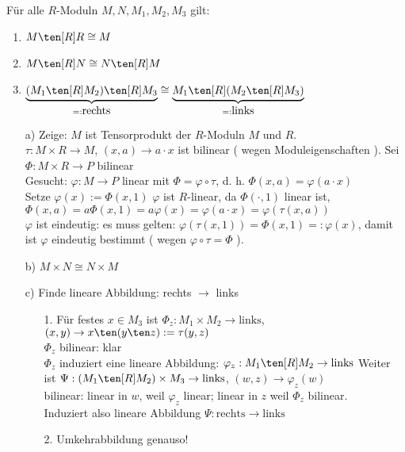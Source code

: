 \begin{Bem}
  Für alle $R$-Moduln $M, N, M_1, M_2, M_3$ gilt:
  \begin{enumerate}
  	\item $M \ten[R] R \cong M$
  	\item $M \ten[R] N \cong N \ten[R] M$
  	\item $\underbrace{(M_1 \ten[R] M_2) \ten[R] M_3}_{=: \mbox{rechts}} \cong 
	\underbrace{M_1 \ten[R] ( M_2 \ten[R] M_3)}_{=: \mbox{links}}$
  \end{enumerate}
\end{Bem}
\begin{Bew}
  \begin{enumerate}
    \item[a)] Zeige: $M$ ist Tensorprodukt der $R$-Moduln $M$ und $R$.\\
	  $\tau: M \times R \rightarrow M$, $(x,a) \rightarrow a \cdot x$ ist bilinear ( wegen 
	  Moduleigenschaften ). Sei $\Phi: M \times R \rightarrow P$ bilinear\\
	  Gesucht: $\varphi: M \rightarrow P$ linear mit $\Phi = \varphi \circ \tau$, d. h. 
	  $\Phi(x,a) = \varphi(a \cdot x)$\\
	  Setze $\varphi(x) := \Phi(x,1)$ $\varphi$ ist $R$-linear, da $\Phi( \cdot, 1)$ linear
	  ist, $\Phi(x,a) = a\Phi(x,1) = a\varphi(x) = \varphi(a \cdot x ) = \varphi(\tau(x,a))$\\
	  $\varphi$ ist eindeutig: es muss gelten: $\varphi(\tau(x,1)) = \Phi(x,1) =: \varphi(x)$, 
	  damit ist $\varphi$ eindeutig bestimmt ( wegen $\varphi \circ \tau = \Phi$ ).
    \item[b)] $M \times N \cong N \times M$
    \item[c)] Finde lineare Abbildung: rechts $\rightarrow$ links
	  \begin{enumerate}
	    \item[ 1. ] Für festes $x \in M_3$ ist $\Phi_z: M_1 \times M_2 \rightarrow \mbox{links}$, 
		  $(x,y) \rightarrow x \ten (y \ten z) := \tau ( y,z )$\\
		  $\Phi_z$ bilinear: klar\\
		  $\Phi_z$ induziert eine lineare Abbildung: $\varphi_z: M_1 \ten[R] M_2 \rightarrow \mbox{links}$
		  Weiter ist $\Psi: ( M_1 \ten[R] M_2 ) \times M_3 \rightarrow \mbox{links}$,
		  $(w,z) \rightarrow \varphi_z (w)$\\
		  bilinear: linear in $w$, weil $\varphi_z$ linear; linear in $z$ weil $\Phi_z$ bilinear.\\
		  Induziert also lineare Abbildung $\Psi: \mbox{rechts} \rightarrow \mbox{links}$
	    \item[ 2. ] Umkehrabbildung genauso!
	  \end{enumerate}
  \end{enumerate}
\end{Bew}

